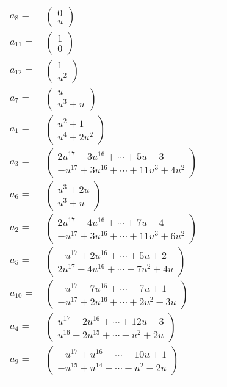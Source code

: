 \documentclass[1p]{elsarticle_modified}
\theoremstyle{definition}
\begin{document}
\begin{tabular}{m{7pt} m{180pt} m{7pt} m{180pt} }
\flushright $a_{8}=$&$\begin{pmatrix}0\\u\end{pmatrix}$ \\
\flushright $a_{11}=$&$\begin{pmatrix}1\\0\end{pmatrix}$ \\
\flushright $a_{12}=$&$\begin{pmatrix}1\\u^2\end{pmatrix}$ \\
\flushright $a_{7}=$&$\begin{pmatrix}u\\u^3+u\end{pmatrix}$ \\
\flushright $a_{1}=$&$\begin{pmatrix}u^2+1\\u^4+2 u^2\end{pmatrix}$ \\
\flushright $a_{3}=$&$\begin{pmatrix}2 u^{17}-3 u^{16}+\cdots+5 u-3\\- u^{17}+3 u^{16}+\cdots+11 u^3+4 u^2\end{pmatrix}$ \\
\flushright $a_{6}=$&$\begin{pmatrix}u^3+2 u\\u^3+u\end{pmatrix}$ \\
\flushright $a_{2}=$&$\begin{pmatrix}2 u^{17}-4 u^{16}+\cdots+7 u-4\\- u^{17}+3 u^{16}+\cdots+11 u^3+6 u^2\end{pmatrix}$ \\
\flushright $a_{5}=$&$\begin{pmatrix}- u^{17}+2 u^{16}+\cdots+5 u+2\\2 u^{17}-4 u^{16}+\cdots-7 u^2+4 u\end{pmatrix}$ \\
\flushright $a_{10}=$&$\begin{pmatrix}- u^{17}-7 u^{15}+\cdots-7 u+1\\- u^{17}+2 u^{16}+\cdots+2 u^2-3 u\end{pmatrix}$ \\
\flushright $a_{4}=$&$\begin{pmatrix}u^{17}-2 u^{16}+\cdots+12 u-3\\u^{16}-2 u^{15}+\cdots- u^2+2 u\end{pmatrix}$ \\
\flushright $a_{9}=$&$\begin{pmatrix}- u^{17}+u^{16}+\cdots-10 u+1\\- u^{15}+u^{14}+\cdots- u^2-2 u\end{pmatrix}$\\&\end{tabular}
\end{document}
